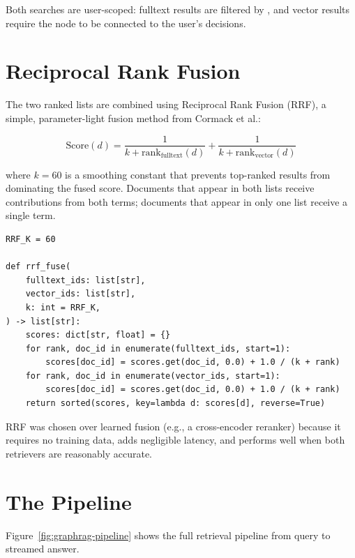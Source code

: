 Both searches are user-scoped: fulltext results are filtered by
, and vector results require the node to be connected to
the user's decisions.


\section{Reciprocal Rank Fusion}
\label{sec:rrf}

The two ranked lists are combined using Reciprocal Rank Fusion (RRF),
a simple, parameter-light fusion method from Cormack et al.:

\[
    \text{Score}(d) = \frac{1}{k + \text{rank}_{\text{fulltext}}(d)}
                    + \frac{1}{k + \text{rank}_{\text{vector}}(d)}
\]

where $k = 60$ is a smoothing constant that prevents top-ranked results
from dominating the fused score.  Documents that appear in both lists
receive contributions from both terms; documents that appear in only
one list receive a single term.

\begin{lstlisting}[style=python, caption={RRF implementation from \codefile{services/graph\_rag.py}.}]
RRF_K = 60

def rrf_fuse(
    fulltext_ids: list[str],
    vector_ids: list[str],
    k: int = RRF_K,
) -> list[str]:
    scores: dict[str, float] = {}
    for rank, doc_id in enumerate(fulltext_ids, start=1):
        scores[doc_id] = scores.get(doc_id, 0.0) + 1.0 / (k + rank)
    for rank, doc_id in enumerate(vector_ids, start=1):
        scores[doc_id] = scores.get(doc_id, 0.0) + 1.0 / (k + rank)
    return sorted(scores, key=lambda d: scores[d], reverse=True)
\end{lstlisting}

RRF was chosen over learned fusion (e.g., a cross-encoder reranker)
because it requires no training data, adds negligible latency, and
performs well when both retrievers are reasonably accurate.


\section{The Pipeline}
\label{sec:graphrag-pipeline}

Figure~\ref{fig:graphrag-pipeline} shows the full retrieval pipeline
from query to streamed answer.

